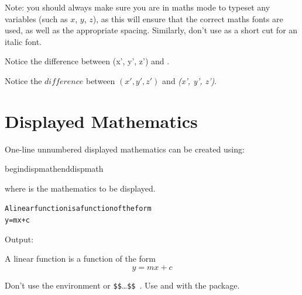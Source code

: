 Note: you should always make sure you are in maths mode to
typeset any variables (such as $x$, $y$, $z$), as this will
ensure that the correct maths fonts are used, as well as the
appropriate spacing. Similarly, don't use 
as a short cut for an italic font.
\begin{codeS}[\linewidth]
Notice the difference between 
(x', y', z') and
.
\end{codeS}%
\begin{resultS}
Notice the $difference$ between $(x', y', z')$ and
\textit{(x', y', z')}.
\end{resultS}


\section{Displayed Mathematics}
\label{sec:displayed}

One-line unnumbered displayed mathematics can be created using:
\begin{definition}
\gls{begindispmath}\gls{enddispmath}
\end{definition}
where  is the mathematics to be displayed.

\begin{code}
\begin{alltt}
A linear function is a function of the form
 y = mx + c 
\end{alltt}
\end{code}%
Output:
\begin{result}
A linear function is a function of the form
\[ y = mx + c \]
\end{result}%

\warning Don't use the  environment or \verb|$$|\ldots\verb|$$|~\cite{l2tabu}.
Use  and  with
the  package.

